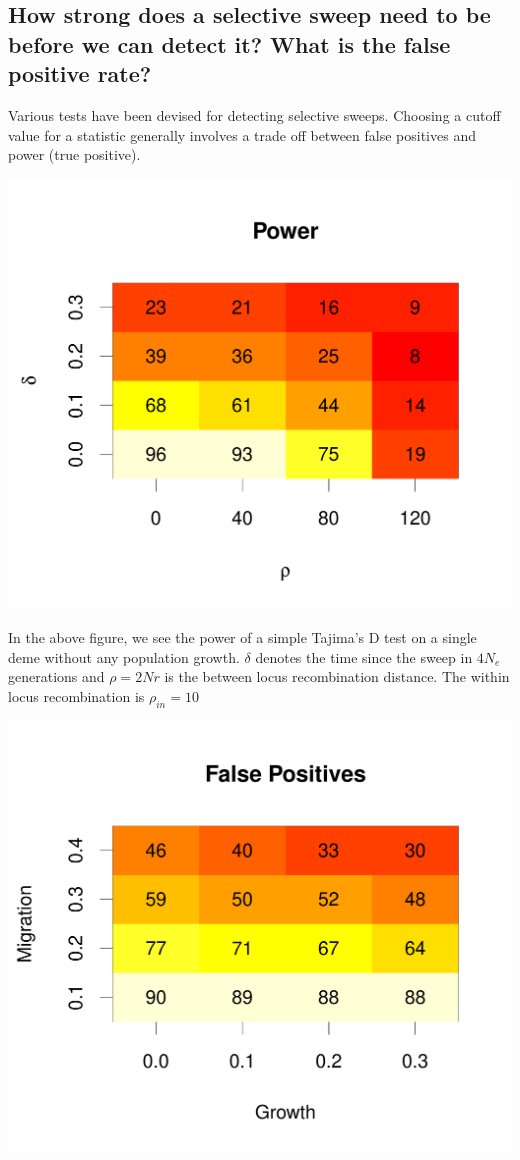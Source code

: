 \documentclass[portrait,final]{baposter}
\begin{document}
\begin{poster}
{\subsection*{How strong does a selective sweep need to be before we can detect
it? What is the false positive rate?}
Various tests have been devised for detecting selective sweeps. Choosing a cutoff
value for a statistic generally involves a trade off between false positives and
power (true positive).
\vspace{-.25cm}
\begin{center} 
\includegraphics[width=1.05\textwidth]{power.pdf}
\end{center}
\vspace{-.25cm}
In the above figure, we see the power of a simple Tajima's D test on a single
deme without any population growth. $\delta$ denotes the time since the sweep in
$4N_e$ generations and $\rho=2Nr$ is the between locus recombination distance. The
within locus recombination is $\rho_{in}=10$
\vspace{-.25cm}
\begin{center}
\includegraphics[width=1.05\textwidth]{false.pdf}

\end{center}}
\end{poster}
\end{document}
